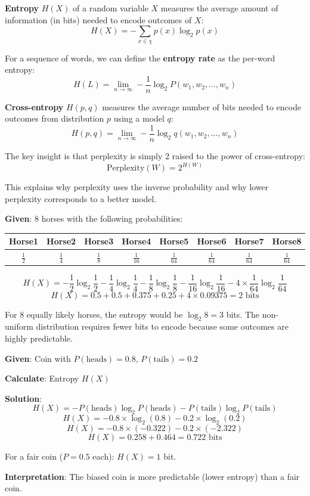 \documentclass[11pt,a4paper]{article}
\begin{document}
\textbf{Entropy} $H(X)$ of a random variable $X$ measures the average amount of information (in bits) needed to encode outcomes of $X$:
\[
H(X) = -\sum_{x \in \chi} p(x) \log_2 p(x)
\]

For a sequence of words, we can define the \textbf{entropy rate} as the per-word entropy:
\[
H(L) = \lim_{n \to \infty} -\frac{1}{n} \log_2 P(w_1, w_2, \ldots, w_n)
\]

\textbf{Cross-entropy} $H(p, q)$ measures the average number of bits needed to encode outcomes from distribution $p$ using a model $q$:
\[
H(p, q) = \lim_{n \to \infty} -\frac{1}{n} \log_2 q(w_1, w_2, \ldots, w_n)
\]

The key insight is that perplexity is simply 2 raised to the power of cross-entropy:
\[
\text{Perplexity}(W) = 2^{H(W)}
\]

This explains why perplexity uses the inverse probability and why lower perplexity corresponds to a better model.

\begin{tcolorbox}[colback=green!5!white,colframe=green!75!black,title=\textbf{Worked Example 11: Entropy of a Horse Race}]
\textbf{Given}: 8 horses with the following probabilities:
\begin{center}
\begin{tabular}{|c|c|c|c|c|c|c|c|}
\hline
Horse1 & Horse2 & Horse3 & Horse4 & Horse5 & Horse6 & Horse7 & Horse8 \\ \hline
$\frac{1}{2}$ & $\frac{1}{4}$ & $\frac{1}{8}$ & $\frac{1}{16}$ & $\frac{1}{64}$ & $\frac{1}{64}$ & $\frac{1}{64}$ & $\frac{1}{64}$ \\ \hline
\end{tabular}
\end{center}

\[
H(X) = -\frac{1}{2}\log_2\frac{1}{2} - \frac{1}{4}\log_2\frac{1}{4} - \frac{1}{8}\log_2\frac{1}{8} - \frac{1}{16}\log_2\frac{1}{16} - 4 \times \frac{1}{64}\log_2\frac{1}{64}
\]
\[
H(X) = 0.5 + 0.5 + 0.375 + 0.25 + 4 \times 0.09375 = 2 \text{ bits}
\]

For 8 equally likely horses, the entropy would be $\log_2 8 = 3$ bits. The non-uniform distribution requires fewer bits to encode because some outcomes are highly predictable.
\end{tcolorbox}

\begin{tcolorbox}[colback=green!5!white,colframe=green!75!black,title=\textbf{Worked Example 12: Entropy of a Biased Coin}]
\textbf{Given}: Coin with $P(\text{heads}) = 0.8$, $P(\text{tails}) = 0.2$

\textbf{Calculate}: Entropy $H(X)$

\textbf{Solution}:
\[
H(X) = -P(\text{heads})\log_2 P(\text{heads}) - P(\text{tails})\log_2 P(\text{tails})
\]
\[
H(X) = -0.8 \times \log_2(0.8) - 0.2 \times \log_2(0.2)
\]
\[
H(X) = -0.8 \times (-0.322) - 0.2 \times (-2.322)
\]
\[
H(X) = 0.258 + 0.464 = 0.722 \text{ bits}
\]

For a fair coin ($P=0.5$ each): $H(X) = 1$ bit.

\textbf{Interpretation}: The biased coin is more predictable (lower entropy) than a fair coin.
\end{tcolorbox}
\end{document}
